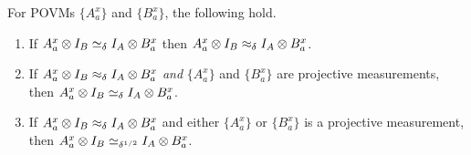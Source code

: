 \begin{fact}
  \label{fact:agreement}
  For POVMs $\{A^x_a\}$ and $\{B^x_a\}$, the following hold.
  \begin{enumerate}
  \item If $A^x_a \otimes I_B \simeq_\delta I_A \otimes B^x_a$ then
    $A^x_a \otimes I_B \approx_\delta I_A \otimes B^x_a$.
    \label{item:consistency-implies-approx}
  \item If $A^x_a \otimes I_B \approx_\delta I_A \otimes B^x_a$
    \emph{and} $\{A^x_a\}$ and $\{B^x_a\}$ are projective measurements, then
    $A^x_a \otimes I_B \simeq_\delta I_A \otimes B^x_a$.
    \label{item:both-projectors-implies-consistency}
  \item If $A^x_a \otimes I_B \approx_\delta I_A \otimes B^x_a$ and
    either $\{A^x_a\}$ or $\{B^x_a\}$ is a projective measurement, then
    $A^x_a \otimes I_B \simeq_{\delta^{1/2}} I_A \otimes B^x_a$.
    \label{item:one-projector-implies-consistency}
  \end{enumerate}
\end{fact}

